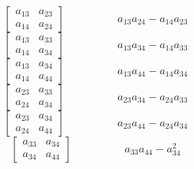 $$\left[\begin{matrix}a_{13} & a_{23}\\a_{14} & a_{24}\end{matrix}\right]\hspace{2cm} a_{13} a_{24} - a_{14} a_{23}$$   
$$\left[\begin{matrix}a_{13} & a_{33}\\a_{14} & a_{34}\end{matrix}\right]\hspace{2cm} a_{13} a_{34} - a_{14} a_{33}$$   
$$\left[\begin{matrix}a_{13} & a_{34}\\a_{14} & a_{44}\end{matrix}\right]\hspace{2cm} a_{13} a_{44} - a_{14} a_{34}$$   
$$\left[\begin{matrix}a_{23} & a_{33}\\a_{24} & a_{34}\end{matrix}\right]\hspace{2cm} a_{23} a_{34} - a_{24} a_{33}$$   
$$\left[\begin{matrix}a_{23} & a_{34}\\a_{24} & a_{44}\end{matrix}\right]\hspace{2cm} a_{23} a_{44} - a_{24} a_{34}$$   
$$\left[\begin{matrix}a_{33} & a_{34}\\a_{34} & a_{44}\end{matrix}\right]\hspace{2cm} a_{33} a_{44} - a_{34}^{2}$$